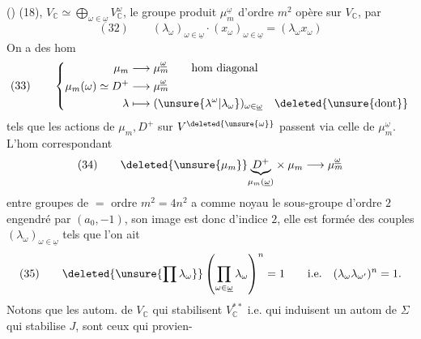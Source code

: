 () (18), $V_{\mathbb C}\simeq\bigoplus_{\omega\in\underline\omega}V_{\mathbb C}^{\omega}$, le groupe produit $\mu_m^{\underline\omega}$ d'ordre $m^2$ opère sur $V_{\mathbb C}$, par
\[
(32)\qquad(\lambda_\omega)_{\omega\in\underline\omega}\cdot(x_\omega)_{\omega\in\underline\omega}=(\lambda_\omega x_\omega)
\]
On  a des hom
\[
(33)\qquad\left\{\begin{aligned}
\mu_m&\longrightarrow\mu_m^{\underline\omega}\qquad\text{hom diagonal}\\
\mu_m(\omega)\simeq D^+&\longrightarrow\mu_m^{\underline\omega}\\
\lambda&\longmapsto(\unsure{\lambda^\omega|\lambda_\omega})_{\omega\in\underline\omega}\quad\deleted{\unsure{\mathrm{dont}}}
\end{aligned}\right.
\]
tels que les actions de $\mu_m,D^+$ sur $V^{\deleted{\unsure{\omega}}}$  passent via celle de $\mu_m^{\underline\omega}$. L'hom correspondant
\[
(34)\qquad\deleted{\unsure{\mu_m}}\underset{\mu_m(\underline\omega)}{\underbrace{D^+}}\times\mu_m\longrightarrow\mu_m^{\underline\omega}
\]
entre groupes de $=$ ordre $m^2=4n^2$ a comme noyau le sous-groupe d'ordre $2$ engendré par  $(a_0,-1)$, son image est donc d'indice $2$, elle est formée des couples $(\lambda_\omega)_{\omega\in\underline\omega}$ tels que l'on ait
\[
(35)\qquad\deleted{\unsure{\prod\lambda_\omega}}\left(\prod_{\omega\in\underline\omega}\lambda_\omega\right)^n=1\qquad\mathrm{i.e.}\quad(\lambda_\omega\lambda_{\omega'})^n=1.
\]
Notons que les autom. de $V_{\mathbb C}$ qui stabilisent $V_{\mathbb C}^{**}$ i.e. qui induisent un autom de $\Sigma$ qui stabilise $J$, sont ceux qui provien-
